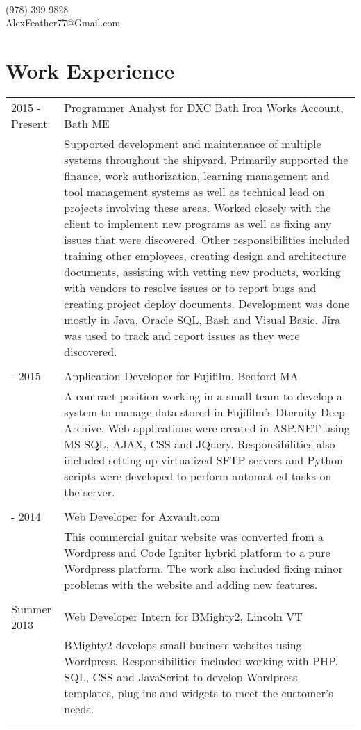 \documentclass[10pt]{article}
\begin{document}
\pagestyle{empty}
\selectfont

{\\
(978) 399 9828\\AlexFeather77@Gmail.com\\}

\section*{\selectfont Work Experience}
\begin{tabular}{p{2.1cm}|p{14.9cm}}
	2015 - Present & Programmer Analyst for DXC Bath Iron Works Account, Bath ME\\&\footnotesize{Supported development and maintenance of multiple systems throughout the shipyard. Primarily supported the finance, work authorization, learning management and tool management systems as well as technical lead on projects involving these areas. Worked closely with the client to implement new programs as well as fixing any issues that were discovered. Other responsibilities included training other employees, creating design and architecture documents, assisting with vetting new products, working with vendors to resolve issues or to report bugs and creating project deploy documents. Development was done mostly in Java, Oracle SQL, Bash and Visual Basic. Jira was used to track and report issues as they were discovered.}\\\multicolumn{2}{c}{} \\
	\centering 2014 - 2015 & Application Developer for Fujifilm, Bedford MA\\&\footnotesize{A contract position working in a small team to develop a system to manage data stored in Fujifilm's Dternity Deep Archive. Web applications were created in ASP.NET using MS SQL, AJAX, CSS and JQuery. Responsibilities also included setting up virtualized SFTP servers and Python scripts were developed to perform automat 	ed tasks on the server.}\\\multicolumn{2}{c}{} \\
	\centering 2013 - 2014 & Web Developer for Axvault.com\\&\footnotesize{This commercial guitar website was converted from a Wordpress and Code Igniter hybrid platform to a pure Wordpress platform. The work also included fixing minor problems with the website and adding new features.}\\\multicolumn{2}{c}{} \\
	\centering Summer 2013 & Web Developer Intern for BMighty2, Lincoln VT\\&\footnotesize{BMighty2 develops small business websites using Wordpress. Responsibilities included working with PHP, SQL, CSS and JavaScript to develop Wordpress templates, plug-ins and widgets to meet the customer's needs.}\\\multicolumn{2}{c}{} \\
\end{tabular}
\end{document}
